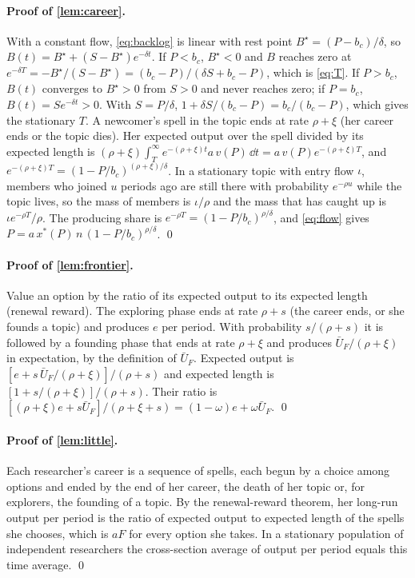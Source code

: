 \paragraph{Proof of \cref{lem:career}.} With a constant flow, \eqref{eq:backlog}
is linear with rest point $B^\star=(P-b_c)/\delta$, so
$B(t)=B^\star+(S-B^\star)e^{-\delta t}$. If $P<b_c$, $B^\star<0$ and $B$ reaches
zero at $e^{-\delta T}=-B^\star/(S-B^\star)=(b_c-P)/(\delta S+b_c-P)$, which is
\eqref{eq:T}. If $P>b_c$, $B(t)$ converges to $B^\star>0$ from $S>0$ and never
reaches zero; if $P=b_c$, $B(t)=Se^{-\delta t}>0$. With $S=P/\delta$,
$1+\delta S/(b_c-P)=b_c/(b_c-P)$, which gives the stationary $T$. A newcomer's
spell in the topic ends at rate $\rho+\xi$ (her career ends or the topic dies).
Her expected output over the spell divided by its expected length is
$(\rho+\xi)\int_T^\infty e^{-(\rho+\xi)t}a\,v(P)\,\dd t=a\,v(P)e^{-(\rho+\xi)T}$, and
$e^{-(\rho+\xi)T}=(1-P/b_c)^{(\rho+\xi)/\delta}$. In a stationary topic with
entry flow $\iota$, members who joined $u$ periods ago are still there with
probability $e^{-\rho u}$ while the topic lives, so the mass of members is
$\iota/\rho$ and the mass that has caught up is $\iota e^{-\rho T}/\rho$. The
producing share is $e^{-\rho T}=(1-P/b_c)^{\rho/\delta}$, and \eqref{eq:flow} gives
$P=a\,x^*(P)\,n\,(1-P/b_c)^{\rho/\delta}$. \qed

\paragraph{Proof of \cref{lem:frontier}.} Value an option by the ratio of its
expected output to its expected length (renewal reward). The exploring phase
ends at rate $\rho+s$ (the career ends, or she founds a topic) and produces $e$
per period. With probability $s/(\rho+s)$ it is followed by a founding phase that
ends at rate $\rho+\xi$ and produces $\bar U_F/(\rho+\xi)$ in expectation, by the
definition of $\bar U_F$. Expected output is
$[e+s\,\bar U_F/(\rho+\xi)]/(\rho+s)$ and expected length is
$[1+s/(\rho+\xi)]/(\rho+s)$. Their ratio is
$[(\rho+\xi)e+s\bar U_F]/(\rho+\xi+s)=(1-\omega)e+\omega\bar U_F$. \qed

\paragraph{Proof of \cref{lem:little}.} Each researcher's career is a sequence of
spells, each begun by a choice among options and ended by the end of her
career, the death of her topic or, for explorers, the founding of a topic.
By the renewal-reward theorem, her long-run output per period is the ratio of
expected output to expected length of the spells she chooses, which is $aF$
for every option she takes. In a stationary population of independent
researchers the cross-section average of output per period equals this time
average. \qed

